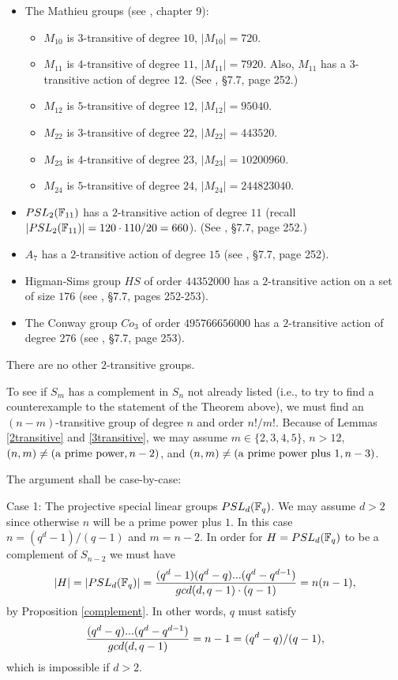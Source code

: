 \begin{itemize}
\item 
The Mathieu groups (see \cite{R}, chapter 9):
\begin{itemize}
\item 
$M_{10}$ is $3$-transitive of degree $10$, 
$|M_{10}|=720$.
\item
$M_{11}$ is $4$-transitive of degree $11$, 
$|M_{11}|=7920$. Also, $M_{11}$ 
has a $3$-transitive action of degree $12$.
(See \cite{DM}, \S 7.7, page 252.)
\item
$M_{12}$ is $5$-transitive of degree $12$, 
$|M_{12}|=95040$.
\item
$M_{22}$ is $3$-transitive of degree $22$, 
$|M_{22}|=443520$.
\item
$M_{23}$ is $4$-transitive of degree $23$, 
$|M_{23}|=10200960$.
\item
$M_{24}$ is $5$-transitive of degree $24$,
$|M_{24}|=244823040$.  
\end{itemize}

\item
$PSL_2({{\Bbb F}}_{11})$ has a $2$-transitive action of degree
$11$ (recall $|PSL_2({{\Bbb F}}_{11})|=120\cdot 110/20 = 660$).
(See \cite{DM}, \S 7.7, page 252.)

\item
$A_7$ has a $2$-transitive action of degree $15$
(see \cite{DM}, \S 7.7, page 252).

\item
Higman-Sims group $HS$ of order 
$44352000$ has a $2$-transitive action on a set of size $176$
(see \cite{DM}, \S 7.7, pages 252-253).

\item
The Conway group $Co_3$ of order $495766656000$
has a $2$-transitive action of degree $276$
(see \cite{DM}, \S 7.7, page 253).
\end{itemize}

There are no other $2$-transitive groups. 

To see if $S_m$ has a complement in $S_n$ not already listed
(i.e., to try to find a counterexample to the statement
of the Theorem above), we must find an $(n-m)$-transitive
group of degree $n$ and order $n!/m!$. Because of
Lemmas \ref{2transitive} and \ref{3transitive},
we may assume
$m\in \{2,3,4,5\}$, $n>12$, $(n,m)\not=({\rm a\ prime\ power},n-2)$,
and $(n,m)\not=({\rm a\ prime\ power\ plus}\ 1,n-3)$.

The argument shall be case-by-case:

Case 1: The projective special linear groups 
$PSL_d({{\Bbb F}}_q)$.
We may assume $d>2$ since otherwise $n$ will be
a prime power plus $1$.
In this case $n=(q^d-1)/(q-1)$ and $m=n-2$. In order
for $H=PSL_d({{\Bbb F}}_q)$ to be a complement
of $S_{n-2}$ we must have
\[
|H|=|PSL_d({{\Bbb F}}_q)|={(q^d-1)(q^d-q)...(q^d-q^{d-1})
\over {gcd(d,q-1)\cdot (q-1)}}=n(n-1),
\]
by Proposition \ref{complement}. In other words, $q$ must satisfy
\[
{(q^d-q)...(q^d-q^{d-1})
\over {gcd(d,q-1)}}=n-1=(q^d-q)/(q-1),
\]
which is impossible if $d>2$.


